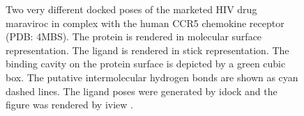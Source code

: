 \begin{figure}
\centering
{}
\caption{Two very different docked poses of the marketed HIV drug maraviroc in complex with the human CCR5 chemokine receptor (PDB: 4MBS). The protein is rendered in molecular surface representation. The ligand is rendered in stick representation. The binding cavity on the protein surface is depicted by a green cubic box. The putative intermolecular hydrogen bonds are shown as cyan dashed lines. The ligand poses were generated by idock \citep{1153} and the figure was rendered by iview \citep{1366}.}
\label{usr:MRV}
\end{figure}


